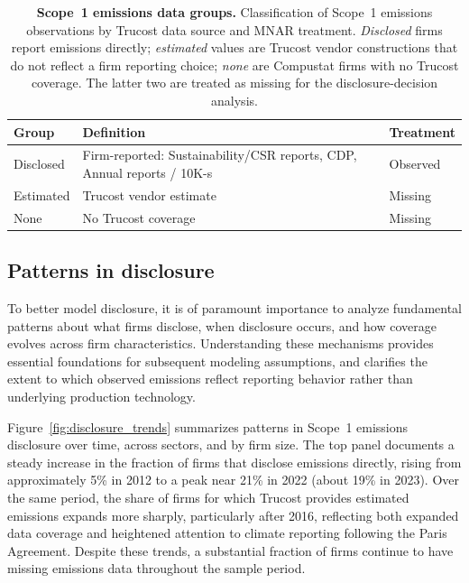\documentclass[a4paper,12pt]{article}
\newcommand{\tabitem}{~~\llap{\footnotesize\textbullet}~~}
\begin{document}
\begin{table}[htbp]
\centering
\small
\caption{\textbf{Scope~1 emissions data groups.} Classification of Scope~1 emissions observations by Trucost data source and MNAR treatment. \emph{Disclosed} firms report emissions directly; \emph{estimated} values are Trucost vendor constructions that do not reflect a firm reporting choice; \emph{none} are Compustat firms with no Trucost coverage. The latter two are treated as missing for the disclosure-decision analysis.}
\label{tab:disclosure_groups}
\begin{tabular}{l p{6cm} l}
\toprule
Group & Definition & Treatment \\
\midrule
Disclosed & Firm-reported: Sustainability/CSR reports, CDP, Annual reports / 10K-s & Observed \\
Estimated & Trucost vendor estimate                        & Missing  \\[.5\normalbaselineskip]
None & No Trucost coverage & Missing  \\
\bottomrule
\end{tabular}
\end{table}

\subsection{Patterns in disclosure}

To better model disclosure, it is of paramount importance to analyze fundamental patterns about what firms disclose, when disclosure occurs, and how coverage evolves across firm characteristics. Understanding these mechanisms provides essential foundations for subsequent modeling assumptions, and clarifies the extent to which observed emissions reflect reporting behavior rather than underlying production technology.

Figure~\ref{fig:disclosure_trends} summarizes patterns in Scope~1 emissions disclosure over time, across sectors, and by firm size. The top panel documents a steady increase in the fraction of firms that disclose emissions directly, rising from approximately 5\% in 2012 to a peak near 21\% in 2022 (about 19\% in 2023). Over the same period, the share of firms for which Trucost provides estimated emissions expands more sharply, particularly after 2016, reflecting both expanded data coverage and heightened attention to climate reporting following the Paris Agreement. Despite these trends, a substantial fraction of firms continue to have missing emissions data throughout the sample period.
\end{document}
